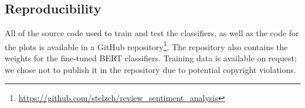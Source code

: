 \documentclass[11pt]{article}
\begin{document}
\subsection{Reproducibility}
All of the source code used to train and test the classifiers, as well as the code for the plots is available in a GitHub repository\footnote{\url{https://github.com/stelzch/review_sentiment_analysis}}.
The repository also contains the weights for the fine-tuned BERT classifiers.
Training data is available on request; we chose not to publish it in the repository due to potential copyright violations.



\end{document}
